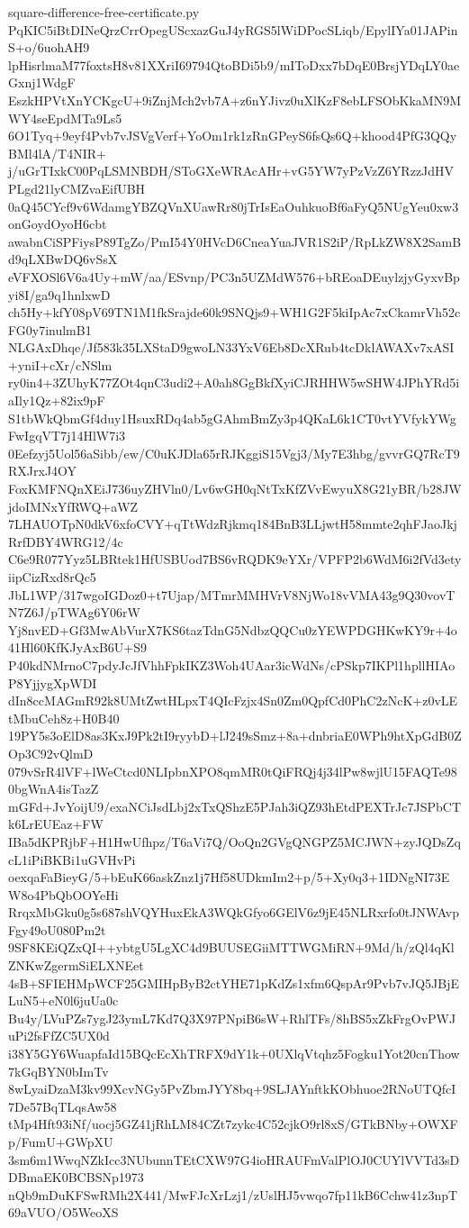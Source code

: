 \documentclass[11pt]{article}
\theoremstyle{definition}
\theoremstyle{remark}
\begin{document}
\begin{filecontents*}[overwrite]{square-difference-free-certificate.py}
PqKIC5iBtDINeQrzCrrOpegUScxazGuJ4yRGS5lWiDPocSLiqb/EpylIYa01JAPinS+o/6uohAH9
lpHisrlmaM77foxtsH8v81XXriI69794QtoBDi5b9/mIToDxx7bDqE0BrsjYDqLY0aeGxnj1WdgF
EszkHPVtXnYCKgcU+9iZnjMch2vb7A+z6nYJivz0uXlKzF8ebLFSObKkaMN9MWY4seEpdMTa9Ls5
6O1Tyq+9eyf4Pvb7vJSVgVerf+YoOm1rk1zRnGPeyS6fsQs6Q+khood4PfG3QQyBMl4lA/T4NIR+
j/uGrTIxkC00PqLSMNBDH/SToGXeWRAcAHr+vG5YW7yPzVzZ6YRzzJdHVPLgd21lyCMZvaEifUBH
0aQ45CYcf9v6WdamgYBZQVnXUawRr80jTrIsEaOuhkuoBf6aFyQ5NUgYeu0xw3onGoydOyoH6cbt
awabnCiSPFiysP89TgZo/PmI54Y0HVcD6CneaYuaJVR1S2iP/RpLkZW8X2SamBd9qLXBwDQ6vSsX
eVFXOSl6V6a4Uy+mW/aa/ESvnp/PC3n5UZMdW576+bREoaDEuylzjyGyxvBpyi8I/ga9q1hnlxwD
ch5Hy+kfY08pV69TN1M1fkSrajde60k9SNQjs9+WH1G2F5kiIpAc7xCkamrVh52cFG0y7inulmB1
NLGAxDhqe/Jf583k35LXStaD9gwoLN33YxV6Eb8DcXRub4tcDklAWAXv7xASI+yniI+cXr/cNSlm
ry0in4+3ZUhyK77ZOt4qnC3udi2+A0ah8GgBkfXyiCJRHHW5wSHW4JPhYRd5iaIly1Qz+82ix9pF
S1tbWkQbmGf4duy1HsuxRDq4ab5gGAhmBmZy3p4QKaL6k1CT0vtYVfykYWgFwIgqVT7j14HlW7i3
0Eefzyj5Uol56aSibb/ew/C0uKJDla65rRJKggiS15Vgj3/My7E3hbg/gvvrGQ7RcT9RXJrxJ4OY
FoxKMFNQnXEiJ736uyZHVln0/Lv6wGH0qNtTxKfZVvEwyuX8G21yBR/b28JWjdoIMNxYfRWQ+aWZ
7LHAUOTpN0dkV6xfoCVY+qTtWdzRjkmq184BnB3LLjwtH58mmte2qhFJaoJkjRrfDBY4WRG12/4c
C6e9R077Yyz5LBRtek1HfUSBUod7BS6vRQDK9eYXr/VPFP2b6WdM6i2fVd3etyiipCizRxd8rQc5
JbL1WP/317wgoIGDoz0+t7Ujap/MTmrMMHVrV8NjWo18vVMA43g9Q30vovTN7Z6J/pTWAg6Y06rW
Yj8nvED+Gf3MwAbVurX7KS6tazTdnG5NdbzQQCu0zYEWPDGHKwKY9r+4o41Hl60KfKJyAxB6U+S9
P40kdNMrnoC7pdyJcJfVhhFpkIKZ3Woh4UAar3icWdNs/cPSkp7IKPl1hpllHIAoP8YjjygXpWDI
dIn8ccMAGmR92k8UMtZwtHLpxT4QIcFzjx4Sn0Zm0QpfCd0PhC2zNcK+z0vLEtMbuCeh8z+H0B40
19PY5s3oElD8as3KxJ9Pk2tI9ryybD+lJ249sSmz+8a+dnbriaE0WPh9htXpGdB0ZOp3C92vQlmD
079vSrR4lVF+lWeCtcd0NLIpbnXPO8qmMR0tQiFRQj4j34lPw8wjlU15FAQTe980bgWnA4isTazZ
mGFd+JvYoijU9/exaNCiJsdLbj2xTxQShzE5PJah3iQZ93hEtdPEXTrJc7JSPbCTk6LrEUEaz+FW
IBa5dKPRjbF+H1HwUfhpz/T6aVi7Q/OoQn2GVgQNGPZ5MCJWN+zyJQDsZqcL1iPiBKBi1uGVHvPi
oexqaFaBieyG/5+bEuK66askZnz1j7Hf58UDkmIm2+p/5+Xy0q3+1IDNgNI73EW8o4PbQbOOYeHi
RrqxMbGku0g5s687shVQYHuxEkA3WQkGfyo6GElV6z9jE45NLRxrfo0tJNWAvpFgy49oU080Pm2t
9SF8KEiQZxQI++ybtgU5LgXC4d9BUUSEGiiMTTWGMiRN+9Md/h/zQl4qKlZNKwZgermSiELXNEet
4sB+SFIEHMpWCF25GMIHpByB2ctYHE71pKdZs1xfm6QspAr9Pvb7vJQ5JBjELuN5+eN0l6juUa0c
Bu4y/LVuPZs7ygJ23ymL7Kd7Q3X97PNpiB6sW+RhlTFs/8hBS5xZkFrgOvPWJuPi2fsFfZC5UX0d
i38Y5GY6WuapfaId15BQcEcXhTRFX9dY1k+0UXlqVtqhz5Fogku1Yot20cnThow7kGqBYN0bImTv
8wLyaiDzaM3kv99XcvNGy5PvZbmJYY8bq+9SLJAYnftkKObhuoe2RNoUTQfcI7De57BqTLqsAw58
tMp4Hft93iNf/uocj5GZ41jRhLM84CZt7zykc4C52cjkO9rl8xS/GTkBNby+OWXFp/FumU+GWpXU
3sm6m1WwqNZkIcc3NUbunnTEtCXW97G4ioHRAUFmValPlOJ0CUYlVVTd3sDDBmaEK0BCBSNp1973
nQb9mDuKFSwRMh2X441/MwFJcXrLzj1/zUslHJ5vwqo7fp11kB6Cchw41z3npT69aVUO/O5WeoXS

\end{filecontents*}
\end{document}
